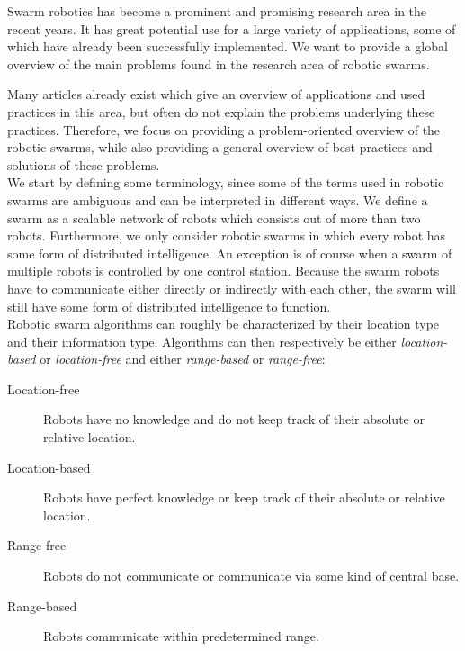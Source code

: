 
Swarm robotics has become a prominent and promising research area in the recent years. 
It has great potential use for a large variety of applications, some of which have already been successfully implemented. 
We want to provide a global overview of the main problems found in the research area of robotic swarms. 

Many articles already exist which give an overview of applications and used practices in this area, but often do not explain the problems underlying these practices. 
Therefore, we focus on providing a problem-oriented overview of the robotic swarms, while also providing a general overview of best practices and solutions of these problems.\\

We start by defining some terminology, since some of the terms used in robotic swarms are ambiguous and can be interpreted in different ways.
We define a swarm as a scalable network of robots which consists out of more than two robots.
Furthermore, we only consider robotic swarms in which every robot has some form of distributed intelligence.
An exception is of course when a swarm of multiple robots is controlled by one control station.
Because the swarm robots have to communicate either directly or indirectly with each other, the swarm will still have some form of distributed intelligence to function.
\\
Robotic swarm algorithms can roughly be characterized by their location type and their information type. Algorithms can then respectively be either \emph{location-based} or \emph{location-free} and either \emph{range-based} or \emph{range-free}:
\begin{description}
	\item[Location-free] Robots have no knowledge and do not keep track of their absolute or relative location.
	\item[Location-based] Robots have perfect knowledge or keep track of their absolute or relative location.
	\item[Range-free] Robots do not communicate or communicate via some kind of central base.
	\item[Range-based] Robots communicate within predetermined range.
\end{description}

